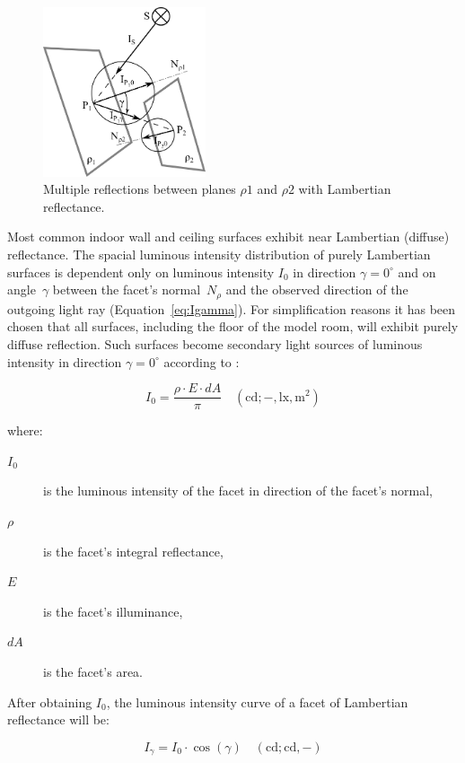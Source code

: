 \begin{figure}[htb]
  \centering
  \includegraphics[width=136pt]{diffuseReflection}
  \caption{Multiple reflections between planes $\rho1$ and $\rho2$ with Lambertian reflectance.}
  \label{fig:difRefl}
\end{figure}

Most common indoor wall and ceiling surfaces exhibit near Lambertian (diffuse) reflectance. The spacial luminous intensity distribution of purely Lambertian surfaces is dependent only on luminous intensity $I_{0}$ in direction $\gamma=0^{\circ}$ and on angle~$\gamma$ between the facet's normal~$N_{\rho}$ and the observed direction of the outgoing light ray (Equation~\ref{eq:Igamma}). For simplification reasons it has been chosen that all surfaces, including the floor of the model room, will exhibit purely diffuse reflection. Such surfaces become secondary light sources of luminous intensity in direction $\gamma=0^{\circ}$ according to \cite{Habel}:

\begin{equation}
I_{0}=\frac{\rho \cdot E \cdot dA}{\pi} \quad \mathrm{(cd;-,lx,m^{2})}
\label{eq:lumInt}
\end{equation}

where:
\begin{description}
	\item[$I_{0}$] is the luminous intensity of the facet in direction of the facet's normal,
	\item[$\rho$] is the facet's integral reflectance,
	\item[$E$] is the facet's illuminance,
	\item[$dA$] is the facet's area.
\end{description}

After obtaining $I_{0}$, the luminous intensity curve of a facet of Lambertian reflectance will be:

\begin{equation}
I_{\gamma}=I_{0} \cdot \cos(\gamma) \quad \mathrm{(cd;cd,-)}
\label{eq:Igamma}
\end{equation}

